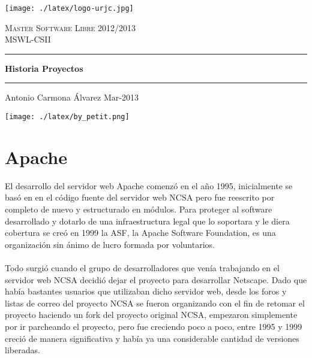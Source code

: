 \documentclass[a4paper,oneside,11pt]{article}
\begin{document}
\vspace{5cm}

\begin{titlepage}
\begin{center}
\texttt{[image: ./latex/logo-urjc.jpg]}

\vspace{4cm}
\textsc{\Large Master Software Libre 2012/2013}\\[0.5cm]
\textsc{\Large MSWL-CSII}\\[0.5cm]
\hrule height 2pt
\begin{center}
{ \huge \bfseries Historia Proyectos}
\end{center}
\hrule height 2pt
\vspace{0.4cm}
\begin{minipage}{0.4\textwidth}
\large
\begin{center}
Antonio Carmona \'Alvarez Mar-2013
\end{center} 
\end{minipage}
\vfill
\texttt{[image: ./latex/by\_petit.png]}
{\large}
\end{center}
\end{titlepage}

\newpage
\tableofcontents  %
\newpage

\section{Apache}

El desarrollo del servidor web Apache comenz\'o en el año 1995, inicialmente se bas\'o en en el c\'odigo fuente del servidor web NCSA
pero fue reescrito por completo de nuevo y estructurado en m\'odulos. Para proteger al software desarrollado y dotarlo de una
infraestructura legal que lo soportara y le diera cobertura se cre\'o en 1999 la ASF, la Apache Software Foundation, es una
organizaci\'on sin \'animo de lucro formada por voluntarios.\\
\\
Todo surgi\'o cuando el grupo de desarrolladores que ven\'ia trabajando en el servidor web NCSA decidi\'o dejar el proyecto para desarrollar Netscape.
Dado que hab\'ia bastantes usuarios que utilizaban dicho servidor web, desde los foros y listas de correo del proyecto NCSA se fueron organizando con 
el fin de retomar el proyecto haciendo un fork del proyecto original NCSA, empezaron simplemente por ir parcheando el proyecto, pero
fue creciendo poco a poco, entre 1995 y 1999 creci\'o de manera significativa y hab\'ia ya una considerable cantidad de versiones liberadas. 
\end{document}
